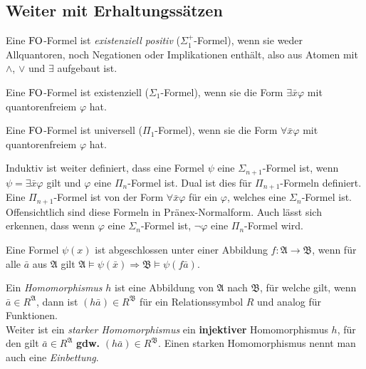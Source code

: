 \subsection*{Weiter mit Erhaltungssätzen}

\begin{definition}
	Eine $\operatorname{FO}$-Formel ist \textit{existenziell positiv} ($\Sigma_1^+$-Formel), wenn sie weder Allquantoren, noch Negationen oder Implikationen enthält, also aus Atomen mit $\land$, $\lor$ und $\exists$ aufgebaut ist.
\end{definition}

\begin{definition}
	Eine $\operatorname{FO}$-Formel ist existenziell ($\Sigma_1$-Formel), wenn sie die Form $\exists \bar{x} \varphi$ mit quantorenfreiem $\varphi$ hat.
	
	Eine $\operatorname{FO}$-Formel ist universell ($\Pi_1$-Formel), wenn sie die Form $\forall \bar{x} \varphi$ mit quantorenfreiem $\varphi$ hat.
\end{definition}
Induktiv ist weiter definiert, dass eine Formel $\psi$ eine $\Sigma_{n+1}$-Formel ist, wenn $\psi=\exists\bar{x}\varphi$ gilt und $\varphi$ eine $\Pi_n$-Formel ist. Dual ist dies für $\Pi_{n+1}$-Formeln definiert. Eine $\Pi_{n+1}$-Formel ist von der Form $\forall \bar{x}\varphi$ für ein $\varphi$, welches eine $\Sigma_n$-Formel ist. Offensichtlich sind diese Formeln in Pränex-Normalform. Auch lässt sich erkennen, dass wenn $\varphi$ eine $\Sigma_n$-Formel ist, $\neg\varphi$ eine $\Pi_n$-Formel wird.

\begin{definition}[Abgeschlossenheit]
	Eine Formel $\psi(x)$ ist abgeschlossen unter einer Abbildung $f:\mathfrak{A}\to\mathfrak{B}$, wenn für alle $\bar{a}$ aus $\mathfrak{A}$ gilt $\mathfrak{A}\models\psi(\bar{x})\Rightarrow\mathfrak{B}\models\psi(f\bar{a})$.
\end{definition}

\begin{definition}[Homomorphismen]
	Ein \textit{Homomorphismus} $h$ ist eine Abbildung von $\mathfrak{A}$ nach $\mathfrak{B}$, für welche gilt, wenn $\bar{a}\in R^\mathfrak{A}$, dann ist $(h \bar{a})\in R^\mathfrak{B}$ für ein Relationssymbol $R$ und analog für Funktionen.
	\\
	Weiter ist ein \textit{starker Homomorphismus} ein \textbf{injektiver} Homomorphismus $h$, für den gilt $\bar{a}\in R^\mathfrak{A}$ \textbf{gdw.} $(h \bar{a})\in R^\mathfrak{B}$. Einen starken Homomorphismus nennt man auch eine \textit{Einbettung}.
\end{definition}

